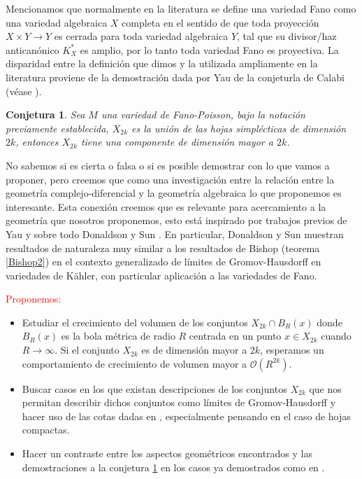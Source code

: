 \documentclass[letterpaper]{report}
\newtheorem{conjetura}{Conjetura}
\begin{document}
\noindent Mencionamos que normalmente en la literatura se define una variedad Fano como una variedad algebraica $X$ completa 
en el sentido de que toda proyecci\'on $X\times Y\rightarrow Y$ es cerrada para toda variedad algebraica $Y$, tal que su divisor/haz antican\'onico
$K^{*}_{X}$ es amplio, por lo tanto toda variedad Fano es proyectiva. La disparidad entre la definici\'on que dimos y la utilizada 
ampliamente en la literatura proviene de la demostraci\'on dada por Yau de la conjeturla de Calabi (v\'ease \cite{S-Yau}).
\begin{conjetura}\label{Bondal}
         Sea $M$ una variedad de Fano-Poisson, bajo la notaci\'on previamente establecida, $X_{2k}$ es la uni\'on de las hojas 
         simpl\'ecticas de dimensi\'on $2k$, entonces $X_{2k}$ tiene una componente de dimensi\'on mayor a $2k$.
\end{conjetura}
\noindent No sabemos si es cierta o falsa o si es posible demostrar con lo que vamos a proponer, pero creemos que como una 
investigaci\'on entre la relaci\'on entre la geometr\'ia complejo-diferencial y la geometr\'ia algebraica lo que proponemos es interesante. 
Esta conexi\'on creemos que es relevante para acercamiento a la geometr\'ia que nosotros proponemos, esto est\'a inspirado por trabajos 
previos de Yau \cite{S-Yau} y sobre todo Donaldson y Sun \cite{D-SS}. En particular, Donaldson y Sun muestran resultados de naturaleza muy similar 
a los resultados de Bishop (teorema \ref{Bishop2}) en el contexto generalizado de l\'imites de Gromov-Hausdorff en variedades de 
K\"ahler, con particular aplicaci\'on a las variedades de Fano.
\\  

                                                \textcolor{red}{\centerline{Proponemos:}}
\begin{itemize}
        \item Estudiar el crecimiento del volumen de los conjuntos $X_{2k}\cap B_{R}(x)$ donde $B_R(x)$ es la bola m\'etrica de radio $R$
        centrada en un punto $x\in X_{2k}$ cuando $R\rightarrow\infty$. Si el conjunto $X_{2k}$ es de dimensi\'on mayor a $2k$, 
        esperamos un comportamiento de crecimiento de volumen mayor a $\mathcal{O}(R^{2k})$.
        
        \item Buscar casos en los que existan descripciones de los conjuntos $X_{2k}$ que nos permitan describir dichos conjuntos
        como l\'imites de Gromov-Hausdorff y hacer uso de las cotas dadas en \cite{D-SS}, especialmente pensando en el caso
        de hojas compactas.

        \item Hacer un contraste entre los aspectos geom\'etricos encontrados y las demostraciones a la conjetura \ref{Bondal} en los
        casos ya demostrados como en \cite{Gua-Pym}.
\end{itemize}
\end{document}
